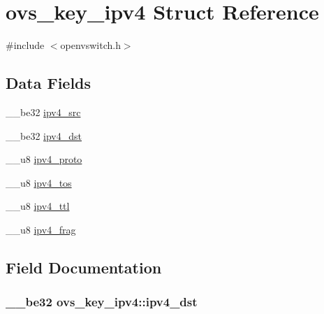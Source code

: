 \hypertarget{structovs__key__ipv4}{}\section{ovs\+\_\+key\+\_\+ipv4 Struct Reference}
\label{structovs__key__ipv4}


{\ttfamily \#include $<$openvswitch.\+h$>$}

\subsection*{Data Fields}
\begin{DoxyCompactItemize}
\item 
\+\_\+\+\_\+be32 \hyperlink{structovs__key__ipv4_a3577eccaa5f978ba303d2424e3e31a13}{ipv4\+\_\+src}
\item 
\+\_\+\+\_\+be32 \hyperlink{structovs__key__ipv4_aa15aabd69c2881215e666585cea50064}{ipv4\+\_\+dst}
\item 
\+\_\+\+\_\+u8 \hyperlink{structovs__key__ipv4_ac973a2efc8d310948e3713a5c5a7fabf}{ipv4\+\_\+proto}
\item 
\+\_\+\+\_\+u8 \hyperlink{structovs__key__ipv4_a0097feb04c0db1cc6621a58f74ac0e33}{ipv4\+\_\+tos}
\item 
\+\_\+\+\_\+u8 \hyperlink{structovs__key__ipv4_ac2142e7329a6e522b3a0d504bec22678}{ipv4\+\_\+ttl}
\item 
\+\_\+\+\_\+u8 \hyperlink{structovs__key__ipv4_a47225bcfead6875052b2678c96d3f9b3}{ipv4\+\_\+frag}
\end{DoxyCompactItemize}


\subsection{Field Documentation}
\hypertarget{structovs__key__ipv4_aa15aabd69c2881215e666585cea50064}{}
\subsubsection[{ipv4\+\_\+dst}]{\setlength{\rightskip}{0pt plus 5cm}\+\_\+\+\_\+be32 ovs\+\_\+key\+\_\+ipv4\+::ipv4\+\_\+dst}\label{structovs__key__ipv4_aa15aabd69c2881215e666585cea50064}
\hypertarget{structovs__key__ipv4_a47225bcfead6875052b2678c96d3f9b3}{}
